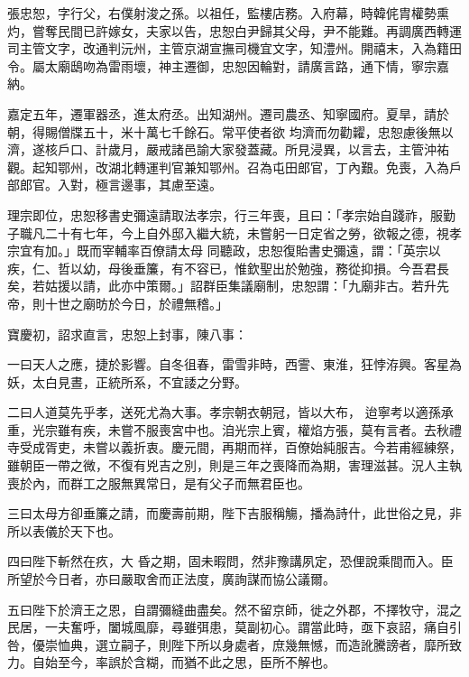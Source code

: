 \begin{pinyinscope}
 張忠恕，字行父，右僕射浚之孫。以祖任，監樓店務。入府幕，時韓侂胄權勢熏灼，嘗奪民間已許嫁女，夫家以告，忠恕白尹歸其父母，尹不能難。再調廣西轉運司主管文字，改通判沅州，主管京湖宣撫司機宜文字，知澧州。開禧末，入為籍田令。屬太廟鴟吻為雷雨壞，神主遷御，忠恕因輪對，請廣言路，通下情，寧宗嘉納。



 嘉定五年，遷軍器丞，進太府丞。出知湖州。遷司農丞、知寧國府。夏旱，請於朝，得賜僧牒五十，米十萬七千餘石。常平使者欲
 均濟而勿勸糶，忠恕慮後無以濟，遂核戶口、計歲月，嚴戒諸邑諭大家發蓋藏。所見浸異，以言去，主管沖祐觀。起知鄂州，改湖北轉運判官兼知鄂州。召為屯田郎官，丁內艱。免喪，入為戶部郎官。入對，極言邊事，其慮至遠。



 理宗即位，忠恕移書史彌遠請取法孝宗，行三年喪，且曰：「孝宗始自踐祚，服勤子職凡二十有七年，今上自外邸入繼大統，未嘗躬一日定省之勞，欲報之德，視孝宗宜有加。」既而宰輔率百僚請太母
 同聽政，忠恕復貽書史彌遠，謂：「英宗以疾，仁、哲以幼，母後垂簾，有不容已，惟欽聖出於勉強，務從抑損。今吾君長矣，若姑援以請，此亦中策爾。」詔群臣集議廟制，忠恕謂：「九廟非古。若升先帝，則十世之廟昉於今日，於禮無稽。」



 寶慶初，詔求直言，忠恕上封事，陳八事：



 一曰天人之應，捷於影響。自冬徂春，雷雪非時，西霅、東淮，狂悖洊興。客星為妖，太白見晝，正統所系，不宜諉之分野。



 二曰人道莫先乎孝，送死尤為大事。孝宗朝衣朝冠，皆以大布，
 迨寧考以適孫承重，光宗雖有疾，未嘗不服喪宮中也。洎光宗上賓，權焰方張，莫有言者。去秋禮寺受成胥吏，未嘗以義折衷。慶元間，再期而祥，百僚始純服吉。今若甫經練祭，雖朝臣一帶之微，不復有兇吉之別，則是三年之喪降而為期，害理滋甚。況人主執喪於內，而群工之服無異常日，是有父子而無君臣也。



 三曰太母方卻垂簾之請，而慶壽前期，陛下吉服稱觴，播為詩什，此世俗之見，非所以表儀於天下也。



 四曰陛下斬然在疚，大
 昏之期，固未暇問，然非豫講夙定，恐俚說乘間而入。臣所望於今日者，亦曰嚴取舍而正法度，廣詢謀而協公議爾。



 五曰陛下於濟王之恩，自謂彌縫曲盡矣。然不留京師，徙之外郡，不擇牧守，混之民居，一夫奮呼，闔城風靡，尋雖弭患，莫副初心。謂當此時，亟下哀詔，痛自引咎，優崇恤典，選立嗣子，則陛下所以身處者，庶幾無憾，而造訛騰謗者，靡所致力。自始至今，率誤於含糊，而猶不此之思，臣所不解也。




\end{pinyinscope}

